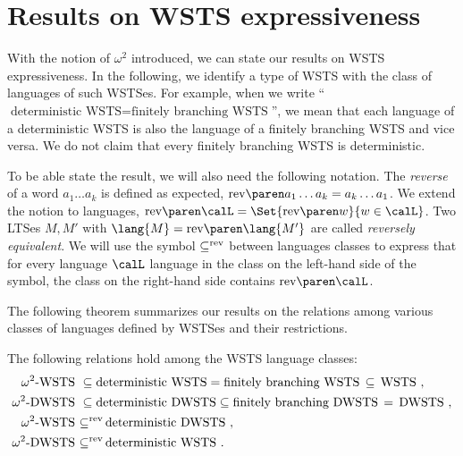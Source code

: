 \documentclass[../../diss.tex]{subfiles}
\begin{document}
\section{Results on WSTS expressiveness}%
\label{Section:WSTSExpressiveness}%

With the notion of $\omega^2$ introduced, we can state our results on WSTS expressiveness.
In the following, we identify a type of WSTS with the class of languages of such WSTSes.
For example, when we write \enquote{$\text{deterministic WSTS} =  \text{finitely branching WSTS}$}, we mean that each language of a deterministic WSTS is also the language of a finitely branching WSTS and vice versa.
We do not claim that every finitely branching WSTS is deterministic.

To be able state the result, we will also need the following notation.
The \emph{reverse} of a word $a_1 \ldots a_k$ is defined as expected, $\rev{a_1 \ldots a_k} = a_k \ldots a_1$.
We extend the notion to languages, $\rev{\calL} = \Set{ \rev{w} }{ w  \in \calL}$.
Two LTSes $M,M'$ with $\lang{M} = \rev{\lang{M'}}$ are called \emph{reversely
equivalent}.
We will use the symbol ${\mathrel{\subseteq^{\text{rev}}}}$ between languages classes to express that for every language $\calL$ language in the class on the left-hand side of the symbol, the class on the right-hand side contains $\rev{\calL}$.

The following theorem summarizes our results on the relations among various classes of languages defined by WSTSes and their restrictions.

\begin{theorem}%
\label{Theorem:WSTSExpressiveness}
    The following relations hold among the WSTS language classes:
    \begin{align*}
        \text{$\omega^2$-WSTS} \ & \subseteq  \text{deterministic WSTS}
        =  \text{finitely branching WSTS} \, \subseteq \, \text{WSTS}
        \ ,
        \\
        \text{$\omega^2$-DWSTS} \ &\subseteq  \text{deterministic DWSTS}
        \subseteq  \text{finitely branching DWSTS} \, = \, \text{DWSTS}
        \ ,
        \\
        \text{$\omega^2$-WSTS} \ & {\mathrel{\subseteq^{\text{rev}}}} \, \text{deterministic DWSTS}
        \ ,
        \\
        \text{$\omega^2$-DWSTS} \ & {\mathrel{\subseteq^{\text{rev}}}} \,  \text{deterministic WSTS}
        \ .
    \end{align*}
\end{theorem}
\end{document}
